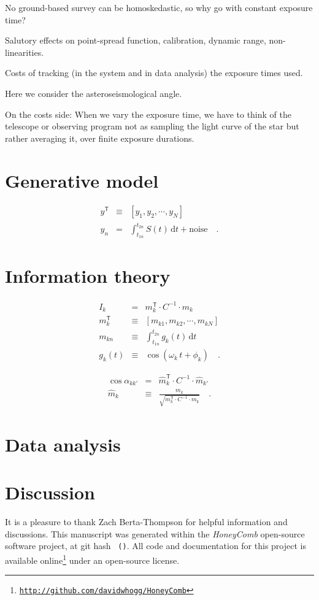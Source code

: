 \documentclass[12pt, preprint]{aastex}
\newcommand{\giturl}{\url{http://github.com/davidwhogg/HoneyComb}}
\newcommand{\project}[1]{\textsl{#1}}
\newcommand{\dd}{\mathrm{d}}
\newcommand{\transpose}[1]{{#1}^{\mathsf{T}}}
\newcommand{\inverse}[1]{{#1}^{-1}}
\begin{document}
No ground-based survey can be homoskedastic, so why go with constant exposure time?

Salutory effects on point-spread function, calibration, dynamic range, non-linearities.

Costs of tracking (in the system and in data analysis) the exposure times used.

Here we consider the asteroseismological angle.

On the costs side: When we vary the exposure time, we have to think of
the telescope or observing program not as sampling the light curve of
the star but rather averaging it, over finite exposure durations.

\section{Generative model}

\begin{eqnarray}
\transpose{y} &\equiv& [y_{1}, y_{2}, \cdots , y_{N}]
\\
y_{n} &=& \int_{t_{1n}}^{t_{2n}} S(t)\,\dd t + \mbox{noise}
\quad.
\end{eqnarray}

\section{Information theory}

\begin{eqnarray}
I_{k} &=& \transpose{m}_{k}\cdot\inverse{C}\cdot m_{k}
\\
\transpose{m}_{k} &\equiv& [m_{k1}, m_{k2}, \cdots , m_{kN}]
\\
m_{kn} &\equiv& \int_{t_{1n}}^{t_{2n}} g_{k}(t)\,\dd t
\\
g_{k}(t) &\equiv& \cos(\omega_{k}\,t + \phi_{k})
\quad .
\end{eqnarray}

\begin{eqnarray}
\cos\alpha_{kk'} &=& \transpose{\hat{m}}_{k}\cdot\inverse{C}\cdot\hat{m}_{k'}
\\
\hat{m}_{k} &\equiv& \frac{m_{k}}{\sqrt{\transpose{m}_{k}\cdot\inverse{C}\cdot m_{k}}}
\quad .
\end{eqnarray}

\section{Data analysis}

\section{Discussion}

\acknowledgements
It is a pleasure to thank Zach Berta-Thompson for helpful information
and discussions.
This manuscript was generated within the \project{HoneyComb}
open-source software project, at git hash
\texttt{\githash~(\gitdate)}.
All code and documentation for this project is available
online\footnote{\texttt{\giturl}} under an open-source license.
\end{document}

